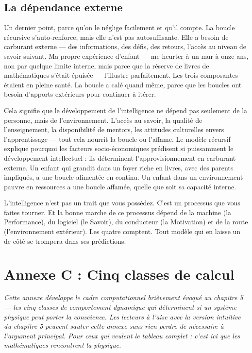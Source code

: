 \documentclass[11pt, twoside, openright]{book}
\begin{document}
\section*{La dépendance externe}

Un dernier point, parce qu'on le néglige facilement et qu'il compte. La boucle récursive s'auto-renforce, mais elle n'est pas autosuffisante. Elle a besoin de carburant externe --- des informations, des défis, des retours, l'accès au niveau de savoir suivant. Ma propre expérience d'enfant --- me heurter à un mur à onze ans, non par quelque limite interne, mais parce que la réserve de livres de mathématiques s'était épuisée --- l'illustre parfaitement. Les trois composantes étaient en pleine santé. La boucle a calé quand même, parce que les boucles ont besoin d'apports extérieurs pour continuer à itérer.

Cela signifie que le développement de l'intelligence ne dépend pas seulement de la personne, mais de l'environnement. L'accès au savoir, la qualité de l'enseignement, la disponibilité de mentors, les attitudes culturelles envers l'apprentissage --- tout cela nourrit la boucle ou l'affame. Le modèle récursif explique pourquoi les facteurs socio-économiques prédisent si puissamment le développement intellectuel : ils déterminent l'approvisionnement en carburant externe. Un enfant qui grandit dans un foyer riche en livres, avec des parents impliqués, a une boucle alimentée en continu. Un enfant dans un environnement pauvre en ressources a une boucle affamée, quelle que soit sa capacité interne.

L'intelligence n'est pas un trait que vous possédez. C'est un processus que vous faites tourner. Et la bonne marche de ce processus dépend de la machine (la Performance), du logiciel (le Savoir), du conducteur (la Motivation) et de la route (l'environnement extérieur). Les quatre comptent. Tout modèle qui en laisse un de côté se trompera dans ses prédictions.


\chapter*{Annexe C : Cinq classes de calcul}

\textit{Cette annexe développe le cadre computationnel brièvement évoqué au chapitre 5 --- les cinq classes de comportement dynamique qui déterminent si un système physique peut porter la conscience. Les lecteurs à l'aise avec la version intuitive du chapitre 5 peuvent sauter cette annexe sans rien perdre de nécessaire à l'argument principal. Pour ceux qui veulent le tableau complet : c'est ici que les mathématiques rencontrent la physique.}
\end{document}
